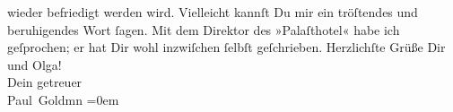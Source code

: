 \begin{ledgroupsized}[t]{13cm}
                  {\pb}wieder befriedigt werden wird. Vielleicht kannſt
               Du mir ein tröſtendes und beruhigendes Wort ſagen. Mit dem Direktor des »Palaſthotel« habe ich geſprochen; er hat Dir wohl inzwiſchen
               ſelbſt geſchrieben.\pend
           \pstart
           Herzlichſte Grüße Dir und Olga! {\\[\baselineskip]}Dein
               getreuer {\\[\baselineskip]}\spacefill\mbox{Paul Goldmn}\pend
           \leftskip=0em{}
         
         \endnumbering{}\end{ledgroupsized}  \newcommand{\dateiname}{L03361}\newcommand{\titel}{Paul Goldmann an Arthur Schnitzler, 27. 1. [1903]}\newcommand{\editorInnen}{Martin Anton Müller und Laura Untner}
      